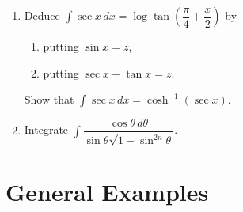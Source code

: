 \documentclass[11pt, a4paper]{article}
\begin{document}
\begin{enumerate}[leftmargin=2em]
\item Deduce $\displaystyle\int \sec x\,dx=\log\tan\left(\dfrac{\pi}{4}+\dfrac{x}{2}\right)$ by
\begin{enumerate}[label=(\roman*)]
\item putting $\sin x=z$,
\item putting $\sec x+\tan x=z$.
\end{enumerate}
Show that $\displaystyle\int \sec x\,dx=\cosh^{-1}(\sec x)$.

\item Integrate $\displaystyle\int \dfrac{\cos\theta\,d\theta}{\sin\theta\sqrt{1-\sin^{2n}\theta}}$.

\end{enumerate}

\section*{General Examples}
\end{document}
